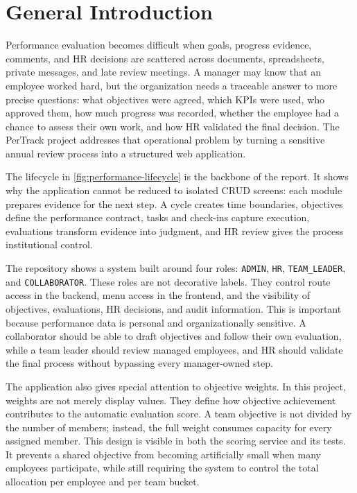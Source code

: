 \chapter*{General Introduction}
Performance evaluation becomes difficult when goals, progress evidence, comments, and HR decisions are scattered across documents, spreadsheets, private messages, and late review meetings. A manager may know that an employee worked hard, but the organization needs a traceable answer to more precise questions: what objectives were agreed, which KPIs were used, who approved them, how much progress was recorded, whether the employee had a chance to assess their own work, and how HR validated the final decision. The PerTrack project addresses that operational problem by turning a sensitive annual review process into a structured web application.



The lifecycle in \cref{fig:performance-lifecycle} is the backbone of the report. It shows why the application cannot be reduced to isolated CRUD screens: each module prepares evidence for the next step. A cycle creates time boundaries, objectives define the performance contract, tasks and check-ins capture execution, evaluations transform evidence into judgment, and HR review gives the process institutional control.

The repository shows a system built around four roles: \texttt{ADMIN}, \texttt{HR}, \texttt{TEAM\_LEADER}, and \texttt{COLLABORATOR}. These roles are not decorative labels. They control route access in the backend, menu access in the frontend, and the visibility of objectives, evaluations, HR decisions, and audit information. This is important because performance data is personal and organizationally sensitive. A collaborator should be able to draft objectives and follow their own evaluation, while a team leader should review managed employees, and HR should validate the final process without bypassing every manager-owned step.

The application also gives special attention to objective weights. In this project, weights are not merely display values. They define how objective achievement contributes to the automatic evaluation score. A team objective is not divided by the number of members; instead, the full weight consumes capacity for every assigned member. This design is visible in both the scoring service and its tests. It prevents a shared objective from becoming artificially small when many employees participate, while still requiring the system to control the total allocation per employee and per team bucket.

